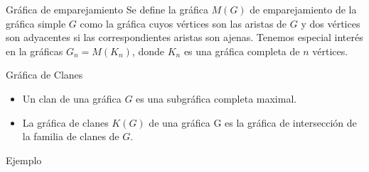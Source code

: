 \documentclass[final,xcolor=svgnames]{beamer}
\begin{document}
\begin{frame}{}
\begin{columns}
\begin{column}{0.5\textwidth}
      \begin{block}{Gráfica de emparejamiento}
        Se define la \alert{gráfica $M(G)$ de emparejamiento} de la gráfica
        simple $G$ como la gráfica cuyos vértices son las aristas de
        $G$ y dos vértices son adyacentes si las correspondientes
        aristas son ajenas. Tenemos especial interés en la gráficas
        $G_{n}=M(K_{n})$, donde $K_{n}$ es una gráfica completa de $n$ vértices.
      \end{block}

      \begin{block}{Gráfica de Clanes}
        \begin{itemize}
        \item Un \alert{clan} de una gráfica $G$ es una subgráfica completa maximal. 
        \item La \alert{gráfica de clanes $K(G)$} de una gráfica G es la gráfica de intersección de
          la familia de clanes de $G$.   
        \end{itemize}
      \end{block}
      
      \begin{block}{Ejemplo}
        \begin{minipage}{0.3\linewidth} 
          \centering
          

\end{minipage}
\end{block}
\end{column}
\end{columns}
\end{frame}
\end{document}
